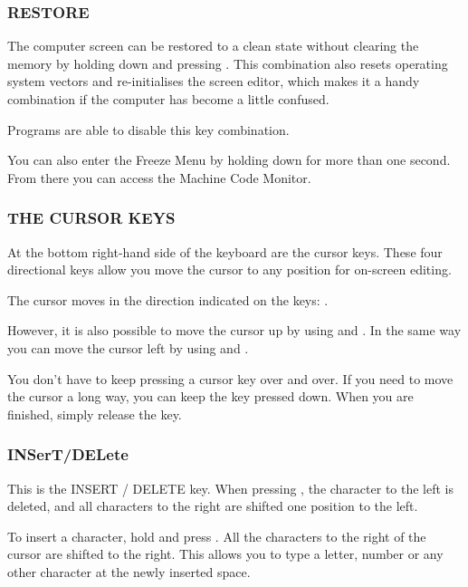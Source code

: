 \subsubsection{RESTORE}

The computer screen can be restored to a clean state without clearing the memory by holding down  and pressing . This combination also resets operating system vectors and re-initialises the screen editor, which makes it a handy combination if the computer has become a little confused.

Programs are able to disable this key combination.

You can also enter the Freeze Menu by holding  down for more than one second. From there you can access the Machine Code Monitor.

\newpage

\subsubsection{THE CURSOR KEYS}

At the bottom right-hand side of the keyboard are the cursor keys. These four directional keys allow you move the cursor to any position for on-screen editing.

The cursor moves in the direction indicated on the keys: \megakey{$\leftarrow$} \megakey{$\uparrow$} \megakey{$\rightarrow$} \megakey{$\downarrow$}.

However, it is also possible to move the cursor up by using  and \megakey{$\downarrow$}. In the same way you can move the cursor left by using  and \megakey{$\rightarrow$}.

You don't have to keep pressing a cursor key over and over. If you need to move the cursor a long way, you can keep the key pressed down. When you are finished, simply release the key.

\subsubsection{INSerT/DELete}

This is the INSERT / DELETE key. When pressing , the character to the left is deleted, and all characters to the right are shifted one position to the left.

To insert a character, hold  and press . All the characters to the right of the cursor are shifted to the right. This allows you to type a letter, number or any other character at the newly inserted space.


